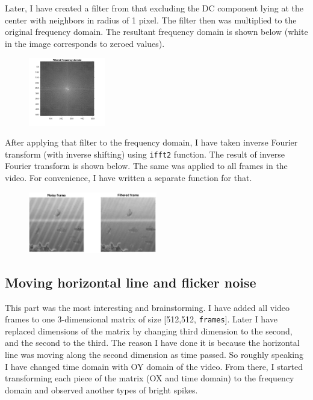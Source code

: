 \documentclass{IEEEtran}
\begin{document}
Later, I have created a filter from that excluding the DC component lying at the center with neighbors in radius of 1 pixel. The filter then was multiplied to the original frequency domain. The resultant frequency domain is shown below (white in the image corresponds to zeroed values).

\begin{figure}[h]
	\centering
	\includegraphics[width=0.3\textwidth]{filtered_frequency.png}
\end{figure}

After applying that filter to the frequency domain, I have taken inverse Fourier transform (with inverse shifting) using \texttt{ifft2} function. The result of inverse Fourier transform is shown below. The same was applied to all frames in the video. For convenience, I have written a separate function for that.

\begin{figure}[h]
	\centering
	\includegraphics[width=0.5\textwidth]{2.png}
\end{figure}

\subsection{Moving horizontal line and flicker noise}
This part was the most interesting and brainstorming. I have added all video frames to one 3-dimensional matrix of size [512,512, \texttt{frames}]. Later I have replaced dimensions of the matrix by changing third dimension to the second, and the second to the third. The reason I have done it is because the horizontal line was moving along the second dimension as time passed. So roughly speaking I have changed time domain with OY domain of the video. From there, I started transforming each piece of the matrix (OX and time domain) to the frequency domain and observed another types of bright spikes.
\end{document}
